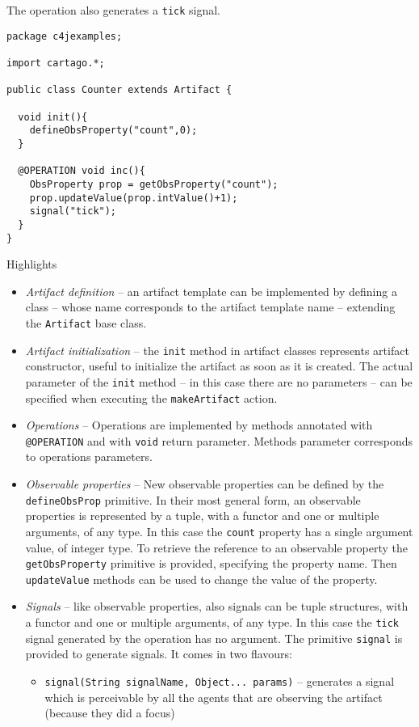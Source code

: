 \documentclass[11pt]{report}
\newcommand\code[1]{{\small{\mbox{\texttt{{#1}}}}}}
\begin{document}
%
The operation also generates a \code{tick} signal.
%
{\small{
\begin{verbatim}
package c4jexamples;

import cartago.*;

public class Counter extends Artifact {

  void init(){
    defineObsProperty("count",0);
  }
	    
  @OPERATION void inc(){
    ObsProperty prop = getObsProperty("count");
    prop.updateValue(prop.intValue()+1);
    signal("tick");
  }
}
\end{verbatim}}}
%
\noindent Highlights
\begin{itemize}
\item \emph{Artifact definition} -- an artifact template can be implemented by defining a class -- whose name corresponds to the artifact template name -- extending the \code{Artifact} base class.
%
\item \emph{Artifact initialization} -- the \code{init} method in artifact classes represents artifact constructor, useful to initialize the artifact as soon as it is created.
%
The actual parameter of the \code{init} method -- in this case there are no parameters -- can be specified when executing the \code{makeArtifact} action. 
%
\item \emph{Operations} -- Operations are implemented by methods annotated with \code{@OPERATION} and with \code{void} return parameter.
%
Methods parameter corresponds to operations parameters.
%
\item \emph{Observable properties} -- New observable properties can be defined by the \code{defineObsProp} primitive.
%
In their most general form, an observable properties is represented by a tuple, with a functor and one or multiple arguments, of any type.
%
In this case the \code{count} property has a single argument value, of integer type.
%
To retrieve the reference to an observable property the \code{getObsProperty} primitive is provided, specifying the property name.
%
Then \code{updateValue} methods can be used to change the value of the property.
%
\item \emph{Signals} -- like observable properties, also signals can be tuple structures, with a functor and one or multiple arguments, of any type.
%
In this case the \code{tick} signal generated by the operation has no argument.
%
The primitive \code{signal} is provided to generate signals. It comes in two flavours:
%
\begin{itemize}
\item \code{signal(String signalName, Object... params)} -- generates a signal which is perceivable by all the agents that are observing the artifact (because they did a focus)

\end{itemize}
\end{itemize}
\end{document}
